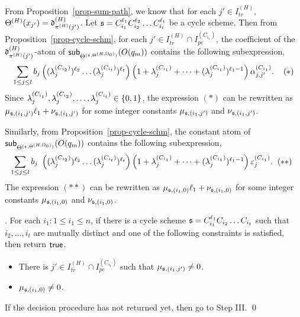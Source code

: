 From Proposition~\ref{prop-sum-path}, we know that for each $j' \in I^{(H)}_{tr}$, $\sumf^{(H)}(x_{j'})=\vard^{(H)}_{\pi^{(H)}(j')}$.  Let $\schm=C_{i_1}^{\ell_1} C_{i_2}^{\ell_2} \dots C_{i_t}^{\ell_t}$ be a cycle scheme. Then from Proposition~\ref{prop-cycle-schm}, for each $j' \in I^{(H)}_{tr} \cap I^{(C_{i_1})}_{pe}$, the coefficient of the $\vard^{(H)}_{\pi^{(H)}(j')}$-atom of $\sub{O(q_m)}{\sumf^{(\schm,\sumf^{(H,\initval_0)})}}$ contains the following subexpression, 
\[
\sum \limits_{1 \le j \le l} 
b_j \left((\cstl^{(C_{i_2})}_{j})^{\ell_2} \dots (\cstl^{(C_{i_t})}_{j})^{\ell_t}\right) 
\left(1+\cstl^{(C_{i_1})}_{j} + \dots + (\cstl^{(C_{i_1})}_{j})^{\ell_1-1} \right) \csta^{(C_{i_1})}_{j,j'}.
\hspace{4mm} (\ast)
\]
Since $\cstl^{(C_{i_1})}_{j}, \cstl^{(C_{i_2})}_{j}, \dots, \cstl^{(C_{i_t})}_{j} \in \{0, 1\}$, the expression $(\ast)$  can be rewritten as  
 $\mu_{\schm, (i_1,j')} \ell_1 + \nu_{\schm, (i_1,j')}$ for some integer constants $\mu_{\schm, (i_1,j')}$ and $\nu_{\schm, (i_1,j')}$. 
 
Similarly, from Proposition~\ref{prop-cycle-schm},  the constant atom of  $\sub{O(q_m)}{\sumf^{(\schm,\sumf^{(H,\initval_0)})}}$ contains the following  subexpression,
\[
\sum \limits_{1 \le j \le l} b_j
\begin{array}{l}
 \left((\lambda^{(C_{i_2})}_{j})^{\ell_2} \dots (\lambda^{(C_{i_t})}_{j})^{\ell_t}\right)
\left(1+\lambda^{(C_{i_1})}_{j} + \dots + (\lambda^{(C_{i_1})}_{j})^{\ell_1-1} \right) \cste^{(C_{i_1})}_{j}. \hspace{2mm} (\ast\ast)
\end{array}
\]
%
The expression $(\ast\ast)$ can be rewritten as $\mu_{\schm,(i_1,0)} \ell_1 + \nu_{\schm,(i_1,0)}$ for some integer constants $\mu_{\schm, (i_1,0)}$ and $\nu_{\schm, (i_1,0)}$.


 
 \smallskip

. For each $i_1: 1 \le i_1 \le n$, if there is a cycle scheme $\schm=C_{i_1}^{\ell_1} C_{i_2} \dots C_{i_t}$ such that $i_2,\dots,i_t$ are mutually distinct and one of the following constraints is satisfied, then return $\ltrue$.
\begin{itemize}
\item There is $j' \in I^{(H)}_{tr} \cap I^{(C_{i_1})}_{pe}$ such that $\mu_{\schm,(i_1,j')} \neq 0$.
%
\item $\mu_{\schm,(i_1,0)} \neq 0$.
%
\end{itemize}
%
If the decision procedure has not returned yet, then go to Step III. \qed


